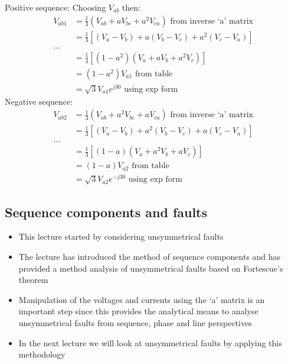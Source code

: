 Positive sequence:
Choosing $V_{ab}$ then:
\begin{align}
	V_{ab1} & = \frac{1}{3}\left(V_{ab} + aV_{bc} + a^2 V_{ca}\right) \textrm{ from inverse `a' matrix}            \\
	        & = \frac{1}{3}\left[\left(V_a - V_b\right) + a\left(V_b- V_c\right)+a^2 \left(V_c - V_a\right)\right] \\
	\dots                                                                                                          \\
	        & = \frac{1}{3}\left[\left(1-a^2\right)\left(V_a + aV_b + a^2 V_c\right)\right]                        \\
	        & = \left(1-a^2\right)V_{a1} \textrm{ from table}                                                      \\
	        & = \sqrt{3} V_{a1} e^{j30} \textrm{ using exp form}
\end{align}
Negative sequence:
\begin{align}
	V_{ab2} & = \frac{1}{3}\left(V_{ab} + a^2V_{bc} + a V_{ca}\right) \textrm{ from inverse `a' matrix}            \\
	        & = \frac{1}{3}\left[\left(V_a - V_b\right) + a^2\left(V_b- V_c\right)+a \left(V_c - V_a\right)\right] \\
	\dots                                                                                                          \\
	        & = \frac{1}{3}\left[\left(1-a\right)\left(V_a + a^2V_b + a V_c\right)\right]                          \\
	        & = \left(1-a\right)V_{a2} \textrm{ from table}                                                        \\
	        & = \sqrt{3} V_{a2} e^{-j30} \textrm{ using exp form}
\end{align}
\subsection{Sequence components and faults}
\begin{itemize}
	\item This lecture started by considering unsymmetrical faults
	\item The lecture has introduced the method of sequence components and has provided a method analysis of unsymmetrical faults based on Fortescue's theorem
	\item Manipulation of the voltages and currents using the `a' matrix is an important step since this provides the analytical means to analyse unsymmetrical faults from sequence, phase and line perspectives
	\item In the next lecture we will look at unsymmetrical faults by applying this methodology
\end{itemize}
